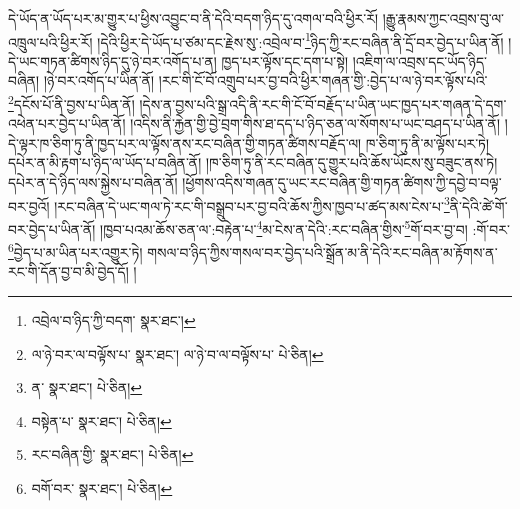 དེ་ཡོད་ན་ཡོད་པར་མ་གྱུར་པ་ཕྱིས་འབྱུང་བ་ནི་དེའི་བདག་ཉིད་དུ་འགལ་བའི་ཕྱིར་རོ། །རྒྱུ་རྣམས་ཀྱང་འབྲས་བུ་ལ་འཁྲུལ་པའི་ཕྱིར་རོ། །དེའི་ཕྱིར་དེ་ཡོད་པ་ཙམ་དང་རྗེས་སུ་:འབྲེལ་བ་\footnote{འབྲེལ་བ་ཉིད་ཀྱི་བདག་  སྣར་ཐང་། }ཉིད་ཀྱི་རང་བཞིན་ནི་དྲོ་བར་བྱེད་པ་ཡིན་ནོ། །དེ་ཡང་གཏན་ཚིགས་ཉིད་དུ་ཉེ་བར་འགོད་པ་ན། ཁྱད་པར་ལྟོས་དང་དག་པ་སྟེ། །འཇིག་ལ་འབྲས་དང་ཡོད་ཉིད་བཞིན། །ཉེ་བར་འགོད་པ་ཡིན་ནོ། །རང་གི་ངོ་བོ་འགྲུབ་པར་བྱ་བའི་ཕྱིར་གཞན་གྱི་:བྱེད་པ་ལ་ཉེ་བར་ལྟོས་པའི་\footnote{ལ་ཉེ་བར་ལ་བལྟོས་པ་  སྣར་ཐང་། ལ་ཉེ་བ་ལ་བལྟོས་པ་  པེ་ཅིན། }དངོས་པོ་ནི་བྱས་པ་ཡིན་ནོ། །དེས་ན་བྱས་པའི་སྒྲ་འདི་ནི་རང་གི་ངོ་བོ་བརྗོད་པ་ཡིན་ཡང་ཁྱད་པར་གཞན་དེ་དག་འཕེན་པར་བྱེད་པ་ཡིན་ནོ། །འདིས་ནི་རྐྱེན་གྱི་བྱེ་བྲག་གིས་ཐ་དད་པ་ཉིད་ཅན་ལ་སོགས་པ་ཡང་བཤད་པ་ཡིན་ནོ། །དེ་ལྟར་ཁ་ཅིག་ཏུ་ནི་ཁྱད་པར་ལ་ལྟོས་ནས་རང་བཞིན་གྱི་གཏན་ཚིགས་བརྗོད་ལ། ཁ་ཅིག་ཏུ་ནི་མ་ལྟོས་པར་ཏེ། དཔེར་ན་མི་རྟག་པ་ཉིད་ལ་ཡོད་པ་བཞིན་ནོ། །ཁ་ཅིག་ཏུ་ནི་རང་བཞིན་དུ་གྱུར་པའི་ཆོས་ཡོངས་སུ་བཟུང་ནས་ཏེ། དཔེར་ན་དེ་ཉིད་ལས་སྐྱེས་པ་བཞིན་ནོ། །ཕྱོགས་འདིས་གཞན་དུ་ཡང་རང་བཞིན་གྱི་གཏན་ཚིགས་ཀྱི་དབྱེ་བ་བལྟ་བར་བྱའོ། །རང་བཞིན་དེ་ཡང་གལ་ཏེ་རང་གི་བསྒྲུབ་པར་བྱ་བའི་ཆོས་ཀྱིས་ཁྱབ་པ་ཚད་མས་ངེས་པ་\footnote{ན་  སྣར་ཐང་།  པེ་ཅིན། }ནི་དེའི་ཚེ་གོ་བར་བྱེད་པ་ཡིན་ནོ། །ཁྱབ་པའམ་ཆོས་ཅན་ལ་:བརྟེན་པ་\footnote{བསྟེན་པ་  སྣར་ཐང་།  པེ་ཅིན། }མ་ངེས་ན་དེའི་:རང་བཞིན་གྱིས་\footnote{རང་བཞིན་གྱི་  སྣར་ཐང་།  པེ་ཅིན། }གོ་བར་བྱ་བ། :གོ་བར་\footnote{བགོ་བར་  སྣར་ཐང་།  པེ་ཅིན། }བྱེད་པ་མ་ཡིན་པར་འགྱུར་ཏེ། གསལ་བ་ཉིད་ཀྱིས་གསལ་བར་བྱེད་པའི་སྒྲོན་མ་ནི་དེའི་རང་བཞིན་མ་རྟོགས་ན་རང་གི་དོན་བྱ་བ་མི་བྱེད་དོ། །

